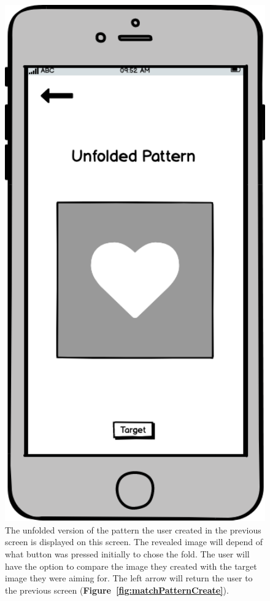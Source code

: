 \documentclass[11pt]{article}
\begin{document}
            \begin{figure}
                \begin{minipage}[c]{0.65\textwidth}
                \caption{The unfolded version of the pattern the user created in the previous screen is displayed on this screen. The revealed image will depend of what button was pressed initially to chose the fold. The user will have the option to compare the image they created with the target image they were aiming for. The left arrow will return the user to the previous screen (\textbf{Figure~\ref{fig:matchPatternCreate}}).}
                \label{fig:revealWithOverlay}
                \end{minipage}\hfill
                \begin{minipage}[c]{0.35\textwidth}
                \includegraphics[width=1\textwidth]{Images/Prototype/prototypeRevealWithOverlay.png}

\end{minipage}
\end{figure}
\end{document}
